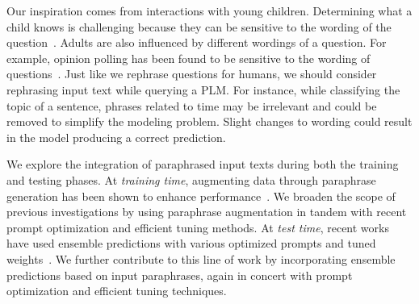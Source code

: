 \documentclass[11pt]{article}
\begin{document}
Our inspiration comes from interactions with young children.
Determining what a child knows is challenging because they can be sensitive to the wording of the question~\cite{childBook}. Adults are also influenced  by different wordings of a question.  For example, opinion polling has been found to be sensitive to the wording of questions~\cite{Broughton1995}. Just like we rephrase questions for humans, we should consider rephrasing input text while querying a PLM. For instance, while classifying the topic of a sentence, phrases related to time may be irrelevant and could be removed to simplify the modeling problem. Slight changes to wording could result in the model producing a correct prediction.

We explore the integration of paraphrased input texts during both the training and testing phases. At \emph{training time}, augmenting data through paraphrase generation has been shown to enhance performance~\cite{wei-zou-2019-eda, feng-etal-2021-survey, DBLP:journals/corr/abs-2106-07499}. We broaden the scope of previous investigations by using paraphrase augmentation in tandem with recent prompt optimization and efficient tuning methods. At \emph{test time}, recent works have used ensemble predictions with various optimized prompts and tuned weights~\cite{izmailov2019averaging, allingham2023simple, li-etal-2023-making}. We further contribute to this line of work by incorporating ensemble predictions based on input paraphrases, again in concert with prompt optimization and efficient tuning techniques.
\end{document}
